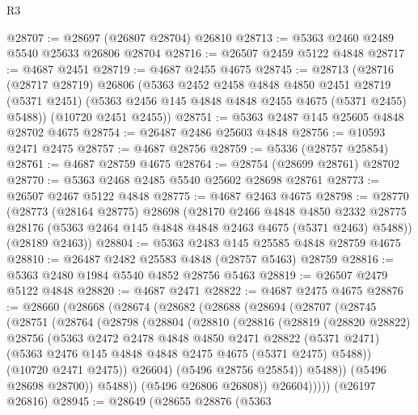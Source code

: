 \begin{lexlean}{R3}
\begin{coremodule}
@28707 := @28697 (@26807 @28704) @26810
@28713 := @5363 @2460 @2489 @5540 @25633 @26806 @28704
@28716 := @26507 @2459 @5122 @4848
@28717 := @4687 @2451
@28719 := @4687 @2455 @4675
@28745 := @28713
    (@28716
      (@28717 @28719)
      @26806
      (@5363
        @2452
        @2458
        @4848
        @4850
        @2451
        @28719
        (@5371 @2451)
        (@5363 @2456 @145 @4848 @4848 @2455 @4675 (@5371 @2455) @5488))
      (@10720 @2451 @2455))
@28751 := @5363 @2487 @145 @25605 @4848 @28702 @4675
@28754 := @26487 @2486 @25603 @4848
@28756 := @10593 @2471 @2475
@28757 := @4687 @28756
@28759 := @5336 (@28757 @25854)
@28761 := @4687 @28759 @4675
@28764 := @28754 (@28699 @28761) @28702
@28770 := @5363 @2468 @2485 @5540 @25602 @28698 @28761
@28773 := @26507 @2467 @5122 @4848
@28775 := @4687 @2463 @4675
@28798 := @28770
    (@28773
      (@28164 @28775)
      @28698
      (@28170
        @2466
        @4848
        @4850
        @2332
        @28775
        @28176
        (@5363 @2464 @145 @4848 @4848 @2463 @4675 (@5371 @2463) @5488))
      (@28189 @2463))
@28804 := @5363 @2483 @145 @25585 @4848 @28759 @4675
@28810 := @26487 @2482 @25583 @4848 (@28757 @5463) @28759
@28816 := @5363 @2480 @1984 @5540 @4852 @28756 @5463
@28819 := @26507 @2479 @5122 @4848
@28820 := @4687 @2471
@28822 := @4687 @2475 @4675
@28876 := @28660
    (@28668
      (@28674
        (@28682
          (@28688
            (@28694
              (@28707
                (@28745
                  (@28751
                    (@28764
                      (@28798
                        (@28804
                          (@28810
                            (@28816
                              (@28819
                                (@28820 @28822)
                                @28756
                                (@5363
                                  @2472
                                  @2478
                                  @4848
                                  @4850
                                  @2471
                                  @28822
                                  (@5371 @2471)
                                  (@5363 @2476 @145 @4848 @4848 @2475 @4675 (@5371 @2475) @5488))
                                (@10720 @2471 @2475))
                              @26604)
                            (@5496 @28756 @25854))
                          @5488))
                      (@5496 @28698 @28700))
                    @5488))
                (@5496 @26806 @26808))
              @26604)))))
    (@26197 @26816)
@28945 := @28649
    (@28655
      @28876
      (@5363

\end{coremodule}
\end{lexlean}
